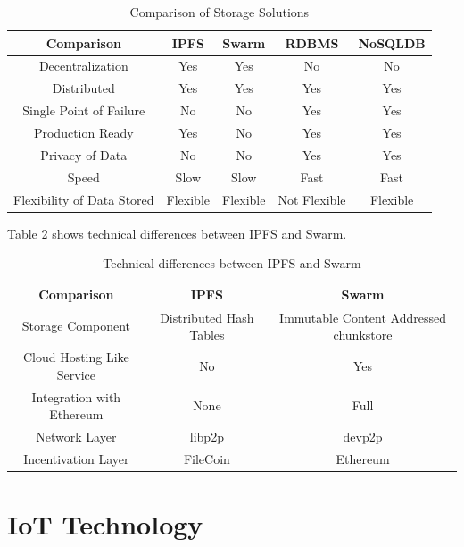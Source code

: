 \documentclass[11pt,openright]{report}
\begin{document}
\begin{table}[!htbp]
	\renewcommand{\arraystretch}{1.3}
	\caption{Comparison of Storage Solutions}
	\label{swarm_eth_comparison}
	\centering
	\begin{tabular}{|c||c|c|c|c|}
		\hline
		\bfseries Comparison & \bfseries IPFS & \bfseries Swarm & \bfseries RDBMS & \bfseries NoSQLDB \\
		\hline\hline
		Decentralization & Yes & Yes & No & No \\ \hline
		Distributed  & Yes & Yes & Yes & Yes \\ \hline
		Single Point of Failure & No & No & Yes & Yes \\ \hline
		Production Ready & Yes & No & Yes & Yes \\ \hline
		Privacy of Data & No & No & Yes & Yes\\ \hline
		Speed & Slow & Slow & Fast & Fast\\ \hline
		Flexibility of Data Stored & Flexible & Flexible & Not Flexible & Flexible \\ \hline
	\end{tabular}
\end{table}

Table \ref{swarm_ipfs_technical} shows technical differences between IPFS and Swarm.

\begin{table}[!htbp]
	\renewcommand{\arraystretch}{1.3}
	\caption{Technical differences between IPFS and Swarm}
	\label{swarm_ipfs_technical}
	\centering
	\begin{tabular}{|c||c|c|}
		\hline
		\bfseries Comparison & \bfseries IPFS & \bfseries Swarm \\
		\hline\hline
		Storage Component & Distributed Hash Tables & Immutable Content Addressed chunkstore \\ \hline
		Cloud Hosting Like Service & No & Yes  \\ \hline
		Integration with Ethereum & None & Full \\ \hline
		Network Layer & libp2p & devp2p \\ \hline
		Incentivation Layer & FileCoin & Ethereum \\ \hline
	\end{tabular}
\end{table}


\chapter{IoT Technology}
\label{chapter:iot_tech}
\end{document}
